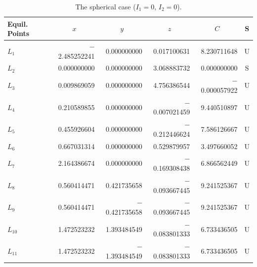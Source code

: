 \documentclass[qe,nameyear,final]{econsocart}
\begin{document}
\begin{table}
\caption{The spherical case ($I_1=0$, $I_2=0$).}
\label{sphericcase}
\begin{tabular}{@{}lrrrrc@{}@{}}
\hline
Equil. Points
& \multicolumn{1}{c}{$x$}
& \multicolumn{1}{c}{$y$}
& \multicolumn{1}{c}{$z$}
& \multicolumn{1}{c}{$C$}
& S \\
\hline
$L_1$    & $-$2.485252241 & 0.000000000    & 0.017100631    & 8.230711648    & U \\
$L_2$    & 0.000000000    & 0.000000000    & 3.068883732    & 0.000000000    & S \\
$L_3$    & 0.009869059    & 0.000000000    & 4.756386544    & $-$0.000057922 & U \\
$L_4$    & 0.210589855    & 0.000000000    & $-$0.007021459 & 9.440510897    & U \\
$L_5$    & 0.455926604    & 0.000000000    & $-$0.212446624 & 7.586126667    & U \\
$L_6$    & 0.667031314    & 0.000000000    & 0.529879957    & 3.497660052    & U \\
$L_7$    & 2.164386674    & 0.000000000    & $-$0.169308438 & 6.866562449    & U \\
$L_8$    & 0.560414471    & 0.421735658    & $-$0.093667445 & 9.241525367    & U \\
$L_9$    & 0.560414471    & $-$0.421735658 & $-$0.093667445 & 9.241525367    & U \\
$L_{10}$ & 1.472523232    & 1.393484549    & $-$0.083801333 & 6.733436505    & U \\
$L_{11}$ & 1.472523232    & $-$1.393484549 & $-$0.083801333 & 6.733436505    & U \\
\hline
\end{tabular}
\end{table}
\end{document}
